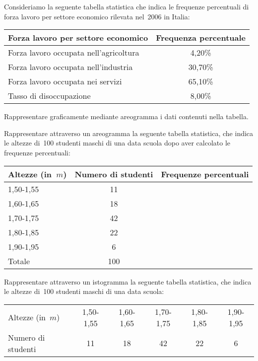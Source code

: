 \begin{esercizio}
\label{ese:A.17}
Consideriamo la seguente tabella statistica che indica le frequenze percentuali di forza lavoro per settore economico rilevata nel~2006 in Italia:
\begin{center}
\begin{tabular}{lc}
\toprule
Forza lavoro per settore economico & Frequenza percentuale\\
\midrule
Forza lavoro occupata nell'agricoltura & 4,20\%\\
Forza lavoro occupata nell'industria & 30,70\%\\
Forza lavoro occupata nei servizi & 65,10\%\\
Tasso di disoccupazione & 8,00\%\\
\bottomrule
\end{tabular}
\end{center}
Rappresentare graficamente mediante areogramma i dati contenuti nella tabella.
\end{esercizio}

\begin{esercizio}
\label{ese:A.18}
Rappresentare attraverso un areogramma la seguente tabella statistica, che indica le altezze di~100 studenti maschi
di una data scuola dopo aver calcolato le frequenze percentuali:
\begin{center}
\begin{tabular}{l*{2}{c}}
\toprule
Altezze (in~$\unit{m}$) & Numero di studenti & Frequenze percentuali\\
\midrule
1,50-1,55 & 11 & \\
1,60-1,65 & 18 & \\
1,70-1,75 & 42 & \\
1,80-1,85 & 22 & \\
1,90-1,95 & 6 & \\
\midrule
Totale & 100 & \\
\bottomrule
\end{tabular}
\end{center}

\end{esercizio}

\begin{esercizio}
\label{ese:A.19}
Rappresentare attraverso un istogramma la seguente tabella statistica, che indica le altezze di~100 studenti maschi di una data scuola:
\begin{center}
\begin{tabular}{l*{5}{c}}
\toprule
Altezze (in~$\unit{m}$) & 1,50-1,55 & 1,60-1,65 & 1,70-1,75 & 1,80-1,85 & 1,90-1,95\\
Numero di studenti & 11 & 18 & 42 & 22 & 6 \\
\bottomrule
\end{tabular}
\end{center}
\end{esercizio}


